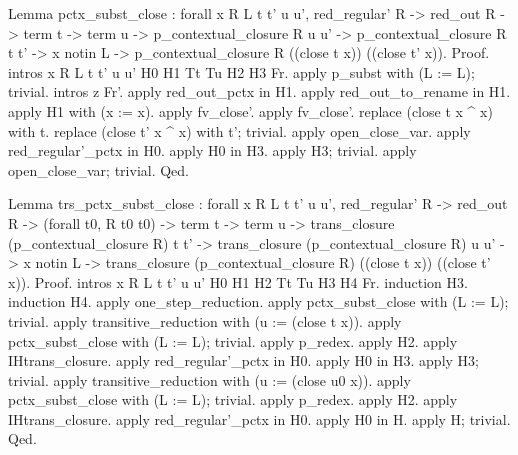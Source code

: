 \documentclass[12pt]{report}
\begin{document}
Lemma pctx\_subst\_close : forall x R L t t' u u', red\_regular' R -> red\_out R -> term t -> term u ->
                         p\_contextual\_closure R u u' ->
                         p\_contextual\_closure R t t' -> x notin L ->
                         p\_contextual\_closure R ((close t x)) ((close t' x)).
Proof.
 intros x R L t t' u u' H0 H1 Tt Tu H2 H3 Fr.
 apply p\_subst with (L := L); trivial. intros z Fr'. 
 apply red\_out\_pctx in H1. apply red\_out\_to\_rename in H1.
 apply H1 with (x := x). apply fv\_close'. apply fv\_close'.
 replace (close t x \^{} x) with t. replace (close t' x \^{} x) with t'; trivial.
 apply open\_close\_var. apply red\_regular'\_pctx in H0. apply H0 in H3. apply H3; trivial.
 apply open\_close\_var; trivial. 
Qed.


Lemma trs\_pctx\_subst\_close : forall x R L t t' u u', 
                         red\_regular' R -> red\_out R -> (forall t0, R t0 t0) ->
                         term t -> term u ->
                         trans\_closure (p\_contextual\_closure R) t t' -> 
                         trans\_closure (p\_contextual\_closure R) u u' -> x notin L ->
                         trans\_closure (p\_contextual\_closure R) ((close t x)) ((close t' x)).
Proof.
 intros x R L t t' u u' H0 H1 H2 Tt Tu H3 H4 Fr. induction H3. induction H4.
 apply one\_step\_reduction. apply pctx\_subst\_close with (L := L); trivial.  
  apply transitive\_reduction with (u := (close t x)).
 apply pctx\_subst\_close with (L := L); trivial. apply p\_redex. apply H2. 
 apply IHtrans\_closure. apply red\_regular'\_pctx in H0. 
 apply H0 in H3. apply H3; trivial.
 apply transitive\_reduction with (u := (close u0 x)).
 apply pctx\_subst\_close with (L := L); trivial. apply p\_redex. apply H2.
 apply IHtrans\_closure. apply red\_regular'\_pctx in H0. 
 apply H0 in H. apply H; trivial.
Qed.
\end{document}

